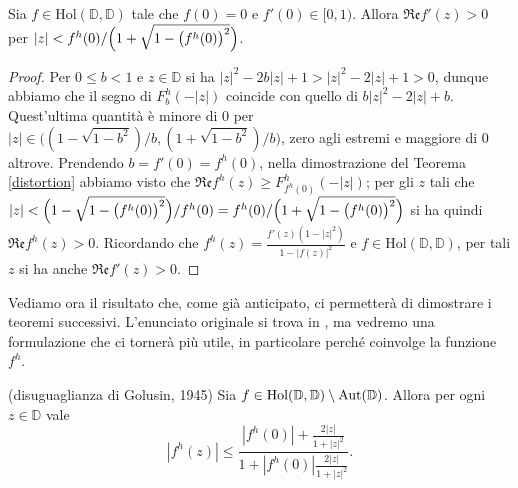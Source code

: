 \begin{cor} \label{distorto}
  Sia $f \in \text{Hol}(\mathbb{D},\mathbb{D})$ tale che $f(0)=0$ e $f'(0) \in [0,1)$. Allora $\mathfrak{Re}f'(z)>0$ per $|z|<f^h(0)/\Bigl(1+\sqrt{1-\bigl(f^h(0)\bigr)^2}\Bigr)$.
\end{cor}

\begin{proof}
  Per $0 \le b<1$ e $z \in \mathbb{D}$ si ha $|z|^2-2b|z|+1>|z|^2-2|z|+1>0$, dunque abbiamo che il segno di $F_b^h(-|z|)$ coincide con quello di $b|z|^2-2|z|+b$. Quest'ultima quantità è minore di $0$ per $|z| \in \bigl((1-\sqrt{1-b^2})/b, (1+\sqrt{1-b^2})/b\bigr)$, zero agli estremi e maggiore di $0$ altrove.
  Prendendo $b=f'(0)=f^h(0)$, nella dimostrazione del Teorema \ref{distortion} abbiamo visto che $\mathfrak{Re}f^h(z) \ge F_{f^h(0)}^h(-|z|)$; per gli $z$ tali che $|z|<\Bigl(1-\sqrt{1-\bigl(f^h(0)\bigr)^2}\Bigr)/f^h(0)=f^h(0)/\Bigl(1+\sqrt{1-\bigl(f^h(0)\bigr)^2}\Bigr)$ si ha quindi $\mathfrak{Re}f^h(z)>0$.
  Ricordando che $f^h(z)=\frac{f'(z)(1-|z|^2)}{1-|f(z)|^2}$ e $f \in \text{Hol}(\mathbb{D},\mathbb{D})$, per tali $z$ si ha anche $\mathfrak{Re}f'(z)>0$.
\end{proof}

Vediamo ora il risultato che, come già anticipato, ci permetterà di dimostrare i teoremi successivi. L'enunciato originale si trova in \cite{GMG}, ma vedremo una formulazione che ci tornerà più utile, in particolare perché coinvolge la funzione $f^h$.

\begin{thm} \label{golusin}
  (disuguaglianza di Golusin, 1945) Sia $f \in \text{\normalfont{Hol}}(\mathbb{D},\mathbb{D})\setminus\text{\normalfont{Aut}}(\mathbb{D})$. Allora per ogni $z \in \mathbb{D}$ vale
  \begin{equation} \label{gol}
    |f^h(z)| \le \frac{|f^h(0)|+\frac{2|z|}{1+|z|^2}}{1+|f^h(0)|\frac{2|z|}{1+|z|^2}}.
  \end{equation}
\end{thm}

